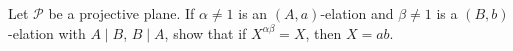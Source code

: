 Let $\mathcal{P}$ be a projective plane. If $\alpha \neq 1$ is an $(A,a)$-elation and $\beta \neq 1$ is a $(B,b)$-elation with $A \mid B$, $B \mid A$, show that if $X^{\alpha\beta} = X$, then $X = ab$.

